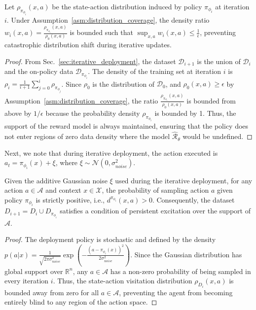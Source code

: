 \documentclass[./dissertation.tex]{subfiles}
\begin{document}
\begin{lemma}
Let $\rho_{\pi_{\phi_i}}(x, a)$ be the state-action distribution induced by policy $\pi_{\phi_i}$ at iteration $i$. Under Assumption~\ref{asm:distribution_coverage}, the density ratio $w_i(x, a) = \frac{\rho_{\pi_{\phi_i}}(x, a)}{\rho_0(x, a)}$ is bounded such that $\sup_{x, a} w_i(x, a) \leq \frac{1}{\epsilon}$, preventing catastrophic distribution shift during iterative updates.
\label{lem:bdr}
\end{lemma}

\begin{proof}
From Sec.~\ref{sec:iterative_deployment}, the dataset $\mathcal{D}_{i+1}$ is the union of $\mathcal{D}_i$ and the on-policy data $\mathcal{D}_{\pi_{\phi_i}}$. The density of the training set at iteration $i$ is $\rho_i = \frac{1}{i+1} \sum_{j=0}^i \rho_{\pi_{\phi_j}}$. Since $\rho_0$ is the distribution of $\mathcal{D}_0$, and $\rho_0(x, a) \geq \epsilon$ by Assumption~\ref{asm:distribution_coverage}, the ratio $\frac{\rho_{\pi_{\phi_i}}(x, a)}{\rho_0(x, a)}$ is bounded from above by $1/\epsilon$ because the probability density $\rho_{\pi_{\phi_i}}$ is bounded by 1. Thus, the support of the reward model is always maintained, ensuring that the policy does not enter regions of zero data density where the model $\hat{\mathcal{R}}_\theta$ would be undefined.
\end{proof}

Next, we note that during iterative deployment, the action executed is $a_t = \pi_{\phi_i}(x) + \xi$, where $\xi \sim \mathcal{N}(0, \sigma_{noise}^2)$.

\begin{lemma}
\label{lem:coverage}
Given the additive Gaussian noise $\xi$ used during the iterative deployment, for any action $a \in \mathcal{A}$ and context $x \in \mathcal{X}$, the probability of sampling action $a$ given policy $\pi_{\phi_i}$ is strictly positive, i.e., $d^{\pi_{\phi_i}}(x, a) > 0$. Consequently, the dataset $D_{i+1} = D_i \cup D_{\pi_{\phi_i}}$ satisfies a condition of persistent excitation over the support of $\mathcal{A}$.
\end{lemma}

\begin{proof}
The deployment policy is stochastic and defined by the density $p(a|x) = \frac{1}{\sqrt{2\pi\sigma_{noise}^2}} \exp\left(-\frac{(a-\pi_{\phi_i}(x))^2}{2\sigma_{noise}^2}\right)$. Since the Gaussian distribution has global support over $\mathbb{R}^n$, any $a \in \mathcal{A}$ has a non-zero probability of being sampled in every iteration $i$. Thus, the state-action visitation distribution $\rho_{D_i}(x, a)$ is bounded away from zero for all $a \in \mathcal{A}$, preventing the agent from becoming entirely blind to any region of the action space.
\end{proof}
\end{document}

